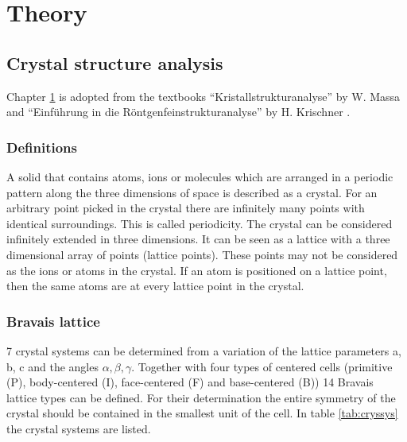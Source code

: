 \part{Theory}
\chapter{Crystal structure analysis}
\label{ch:csa}
Chapter \ref{ch:csa} is adopted from the textbooks ``Kristallstrukturanalyse''  by W. Massa \cite{massa} and ``Einführung in die Röntgenfeinstrukturanalyse'' by H. Krischner \cite{krischner}. 
\section{Definitions}
A solid that contains atoms, ions or molecules which are arranged in a periodic pattern along the three dimensions of space is described as a crystal. For an arbitrary point picked in the crystal there are infinitely many points with identical surroundings. This is called periodicity. The crystal  can be considered infinitely extended in three dimensions. It can be seen as a lattice with a three dimensional array of points (lattice points). These points may not be considered as the ions or atoms in the crystal. If an atom is positioned on a lattice point, then the same atoms are at every lattice point in the crystal. \cite{massa}

 
\section{Bravais lattice}

7 crystal systems can be determined from a variation of the lattice parameters a, b, c and the angles $\alpha, \beta, \gamma$. Together with four types of centered cells (primitive (P), body-centered (I), face-centered (F) and base-centered (B)) 14 Bravais lattice types can be defined. \cite{bravais} For their determination the entire symmetry of the crystal should be contained in the smallest  unit of the cell. In table \ref{tab:cryssys} the crystal systems are listed.

